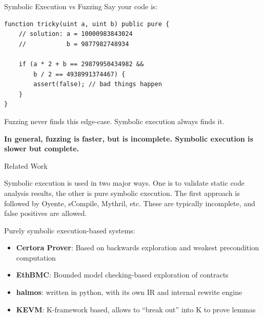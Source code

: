 \documentclass[aspectratio=169]{beamer}
\begin{document}
\begin{frame}[fragile=singleslide]{Symbolic Execution vs Fuzzing}
Say your code is:

\begin{Verbatim}[frame=single, framerule=0.2mm, framesep=2mm,fontsize=\small]
function tricky(uint a, uint b) public pure {
	// solution: a = 10000983843024
	//           b = 9877982748934
	
	if (a * 2 + b == 29879950434982 &&
	    b / 2 == 4938991374467) {
		assert(false); // bad things happen
	}
}
\end{Verbatim}

Fuzzing never finds this edge-case. Symbolic execution always finds it.
\bigskip 

\textbf{In general, fuzzing is faster, but is incomplete. Symbolic execution is slower but complete.}

\end{frame}

\begin{frame}{Related Work}

Symbolic execution is used in two major ways. One is to validate static code analysis results, the other is pure symbolic execution. The first approach is followed by Oyente, sCompile, Mythril, etc. These are typically incomplete, and false positives are allowed.

\bigskip

Purely symbolic execution-based systems:
\begin{itemize}
\item \textbf{Certora Prover}: Based on backwards exploration and weakest precondition computation
\item \textbf{EthBMC}: Bounded model checking-based exploration of contracts
\item \textbf{halmos}: written in python, with its own IR and internal rewrite engine
\item \textbf{KEVM}: K-framework based, allows to ``break out'' into K to prove lemmas
\end{itemize}

\end{frame}
\end{document}
